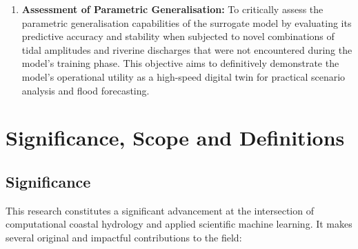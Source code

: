 \begin{enumerate}
    \item \textbf{Assessment of Parametric Generalisation:} To critically assess the parametric generalisation capabilities of the
    surrogate model by evaluating its predictive accuracy and stability when subjected to novel combinations of
    tidal amplitudes and riverine discharges that were not encountered during the model's training phase. This objective aims to definitively demonstrate the model's operational utility as a high-speed digital twin for practical scenario
    analysis and flood forecasting.
\end{enumerate}

\section{Significance, Scope and Definitions}

\subsection*{Significance}

This research constitutes a significant advancement at the intersection of
computational coastal hydrology and applied scientific machine learning. It makes several original and impactful contributions to the field:

